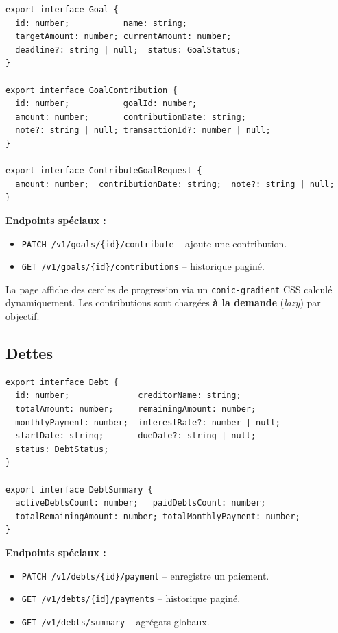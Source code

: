 \documentclass[12pt,a4paper]{article}
\begin{document}
\begin{lstlisting}
export interface Goal {
  id: number;           name: string;
  targetAmount: number; currentAmount: number;
  deadline?: string | null;  status: GoalStatus;
}

export interface GoalContribution {
  id: number;           goalId: number;
  amount: number;       contributionDate: string;
  note?: string | null; transactionId?: number | null;
}

export interface ContributeGoalRequest {
  amount: number;  contributionDate: string;  note?: string | null;
}
\end{lstlisting}

\textbf{Endpoints spéciaux :}
\begin{itemize}
  \item \texttt{PATCH /v1/goals/\{id\}/contribute} -- ajoute une contribution.
  \item \texttt{GET /v1/goals/\{id\}/contributions} -- historique paginé.
\end{itemize}

La page affiche des cercles de progression via un \texttt{conic-gradient} CSS calculé
dynamiquement. Les contributions sont chargées \textbf{à la demande} (\textit{lazy})
par objectif.

\subsection{Dettes}

\begin{lstlisting}
export interface Debt {
  id: number;              creditorName: string;
  totalAmount: number;     remainingAmount: number;
  monthlyPayment: number;  interestRate?: number | null;
  startDate: string;       dueDate?: string | null;
  status: DebtStatus;
}

export interface DebtSummary {
  activeDebtsCount: number;   paidDebtsCount: number;
  totalRemainingAmount: number; totalMonthlyPayment: number;
}
\end{lstlisting}

\textbf{Endpoints spéciaux :}
\begin{itemize}
  \item \texttt{PATCH /v1/debts/\{id\}/payment} -- enregistre un paiement.
  \item \texttt{GET /v1/debts/\{id\}/payments} -- historique paginé.
  \item \texttt{GET /v1/debts/summary} -- agrégats globaux.
\end{itemize}
\end{document}
